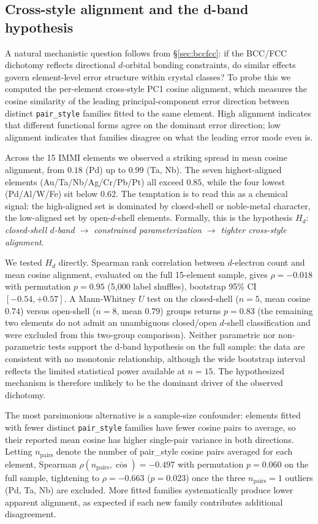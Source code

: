 \documentclass[twocolumn,9pt]{extarticle}
\begin{document}
\subsection{Cross-style alignment and the d-band hypothesis}
\label{sec:dband}

A natural mechanistic question follows from \S\ref{sec:bccfcc}: if the BCC/FCC dichotomy reflects directional $d$-orbital bonding constraints, do similar effects govern element-level error structure within crystal classes? To probe this we computed the per-element cross-style PC1 cosine alignment, which measures the cosine similarity of the leading principal-component error direction between distinct \texttt{pair\_style} families fitted to the same element. High alignment indicates that different functional forms agree on the dominant error direction; low alignment indicates that families disagree on what the leading error mode even is.

Across the 15 IMMI elements we observed a striking spread in mean cosine alignment, from $0.18$ (Pd) up to $0.99$ (Ta, Nb). The seven highest-aligned elements (Au/Ta/Nb/Ag/Cr/Pb/Pt) all exceed $0.85$, while the four lowest (Pd/Al/W/Fe) sit below $0.62$. The temptation is to read this as a chemical signal: the high-aligned set is dominated by closed-shell or noble-metal character, the low-aligned set by open-$d$-shell elements. Formally, this is the hypothesis $H_d$: \textit{closed-shell $d$-band $\to$ constrained parameterization $\to$ tighter cross-style alignment}.

We tested $H_d$ directly. Spearman rank correlation between $d$-electron count and mean cosine alignment, evaluated on the full 15-element sample, gives $\rho = -0.018$ with permutation $p = 0.95$ (5{,}000 label shuffles), bootstrap 95\% CI $[-0.54, +0.57]$. A Mann-Whitney $U$ test on the closed-shell ($n=5$, mean cosine $0.74$) versus open-shell ($n=8$, mean $0.79$) groups returns $p = 0.83$ (the remaining two elements do not admit an unambiguous closed/open $d$-shell classification and were excluded from this two-group comparison). Neither parametric nor non-parametric tests support the d-band hypothesis on the full sample: the data are consistent with no monotonic relationship, although the wide bootstrap interval reflects the limited statistical power available at $n=15$. The hypothesized mechanism is therefore unlikely to be the dominant driver of the observed dichotomy.

The most parsimonious alternative is a sample-size confounder: elements fitted with fewer distinct \texttt{pair\_style} families have fewer cosine pairs to average, so their reported mean cosine has higher single-pair variance in both directions. Letting $n_{\text{pairs}}$ denote the number of pair\_style cosine pairs averaged for each element, Spearman $\rho(n_{\text{pairs}}, \overline{\cos}) = -0.497$ with permutation $p = 0.060$ on the full sample, tightening to $\rho = -0.663$ ($p = 0.023$) once the three $n_{\text{pairs}} = 1$ outliers (Pd, Ta, Nb) are excluded. More fitted families systematically produce lower apparent alignment, as expected if each new family contributes additional disagreement.
\end{document}
